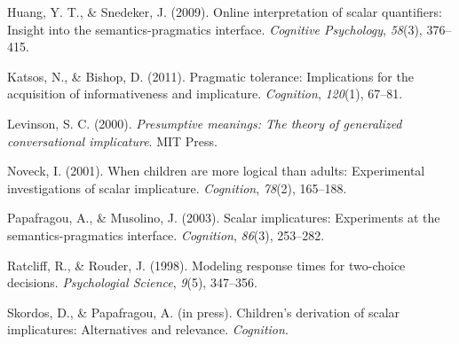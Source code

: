 \documentclass[10pt, letterpaper]{article}
\begin{document}
Huang, Y. T., \& Snedeker, J. (2009). Online interpretation of scalar
quantifiers: Insight into the semantics-pragmatics interface.
\emph{Cognitive Psychology}, \emph{58}(3), 376--415.

Katsos, N., \& Bishop, D. (2011). Pragmatic tolerance: Implications for
the acquisition of informativeness and implicature. \emph{Cognition},
\emph{120}(1), 67--81.

Levinson, S. C. (2000). \emph{Presumptive meanings: The theory of
generalized conversational implicature}. MIT Press.

Noveck, I. (2001). When children are more logical than adults:
Experimental investigations of scalar implicature. \emph{Cognition},
\emph{78}(2), 165--188.

Papafragou, A., \& Musolino, J. (2003). Scalar implicatures: Experiments
at the semantics-pragmatics interface. \emph{Cognition}, \emph{86}(3),
253--282.

Ratcliff, R., \& Rouder, J. (1998). Modeling response times for
two-choice decisions. \emph{Psychologial Science}, \emph{9}(5),
347--356.

Skordos, D., \& Papafragou, A. (in press). Children's derivation of
scalar implicatures: Alternatives and relevance. \emph{Cognition}.
\end{document}
